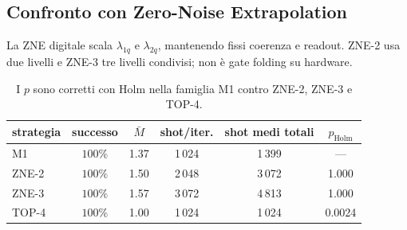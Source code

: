 \begin{onehalfspace}
\begin{table}[H]
\end{table}

\subsection{Confronto con Zero-Noise Extrapolation}
\label{sec:app_zne}

La ZNE digitale scala $\lambda_{1q}$ e $\lambda_{2q}$, mantenendo fissi
coerenza e readout. ZNE-2 usa due livelli e ZNE-3 tre livelli condivisi;
non è gate folding su hardware.

\begin{table}[H]
\centering

\begin{tabular}{lccccc}
\toprule
strategia & successo & $\bar M$ & shot/iter. & shot medi totali & $p_{\mathrm{Holm}}$ \\
\midrule
M1 & $100\%$ & 1.37 & 1\,024 & 1\,399 & --- \\
\addlinespace[0.3em]
ZNE-2 & $100\%$ & 1.50 & 2\,048 & 3\,072 & 1.000 \\
\addlinespace[0.3em]
ZNE-3 & $100\%$ & 1.57 & 3\,072 & 4\,813 & 1.000 \\
\addlinespace[0.3em]
TOP-4 & $100\%$ & 1.00 & 1\,024 & 1\,024 & 0.0024 \\
\bottomrule
\end{tabular}
\caption[Confronto ZNE appaiato]{I $p$ sono corretti con Holm nella
famiglia M1 contro ZNE-2, ZNE-3 e TOP-4.}\label{tab:confronto_zne}

\end{table}

\end{onehalfspace}



